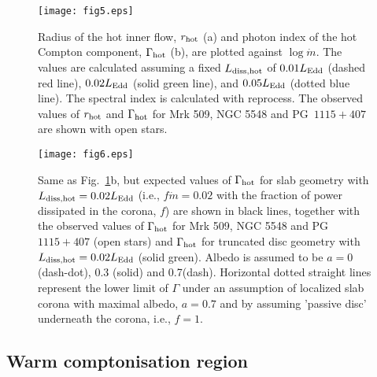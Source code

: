 \documentclass[a4paper,fleqn,usenatbib]{mnras}
\begin{document}
\begin{figure}
\begin{center}
\texttt{[image: fig5.eps]}
\end{center}
    \caption{Radius of the hot inner flow, $r_{\rm hot}$ (a) and 
photon index of the hot Compton component, $\Gamma_{\rm hot}$ (b), are plotted against $\log \dot{m}$. 
The values are calculated assuming 
a fixed $L_{\rm diss, hot}$ of $0.01L_{\rm Edd}$ (dashed red line), $0.02L_{\rm Edd}$ (solid green line), and $0.05L_{\rm Edd}$ (dotted blue line). The spectral index is calculated with reprocess. 
  The observed values of $r_{\rm hot}$ and $\Gamma_{\rm hot}$ for 
 Mrk 509, NGC 5548 and PG~$1115+407$ are shown with open stars. 
}
    \label{fig:gamma}
\end{figure}

\begin{figure}
\begin{center}
\texttt{[image: fig6.eps]}
\end{center}
    \caption{Same as Fig.~\ref{fig:gamma}b, but expected values of $\Gamma_{\rm hot}$ for slab geometry 
    with $L_{\rm diss,hot}=0.02L_{\rm Edd}$ (i.e., $f\dot{m}=0.02$ with the fraction of power dissipated in the corona, $f$) are shown in black lines, together with the observed values of $\Gamma_{\rm hot}$ for 
 Mrk 509, NGC 5548 and PG~$1115+407$ (open stars) and $\Gamma_{\rm hot}$ for truncated disc geometry with $L_{\rm diss,hot}=0.02L_{\rm Edd}$ (solid green). Albedo is assumed to be $a=0$ (dash-dot), 0.3 (solid) and 0.7(dash).
Horizontal dotted straight lines represent the lower limit of $\Gamma$ under an assumption of  localized slab corona with maximal albedo, $a=0.7$ and by assuming 'passive disc' underneath the corona, i.e., $f=1$.
}
    \label{fig:gamma_slab}
\end{figure}

\subsection{Warm comptonisation region}
\end{document}
